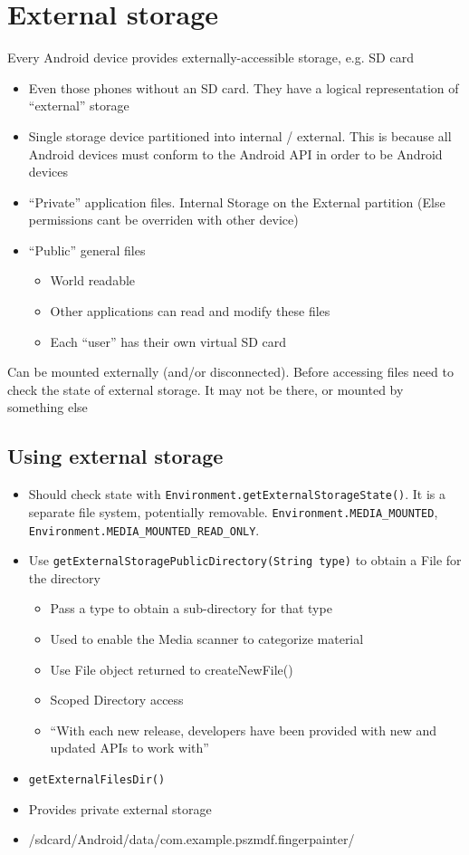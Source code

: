\documentclass{article}
\begin{document}
\section{External storage}
\begin{flushleft}
Every	Android	device	provides	externally-accessible	storage,	e.g.	SD	card
\begin{itemize}
  \item Even those phones without an SD card. They have a logical representation of “external” storage 
  \item Single storage device partitioned into internal / external. This is because all Android devices must conform to the Android API in order to be Android devices 
  \item “Private” application files. Internal Storage on the External partition (Else permissions cant be overriden with other device) 
  \item “Public” general files
  \begin{itemize}
    \item World readable 
    \item Other applications can read and modify these files 
    \item Each “user” has their own virtual SD card
  \end{itemize}
\end{itemize}
Can be mounted externally (and/or disconnected). Before accessing files need to check the state of external storage. It may not be there, or mounted by something else
\end{flushleft}

\subsection{Using external storage}

\begin{itemize}
  \item Should check state with \verb|Environment.getExternalStorageState()|. It is a separate file system, potentially removable. \verb|Environment.MEDIA_MOUNTED|, \verb|Environment.MEDIA_MOUNTED_READ_ONLY|.
  \item Use \texttt{getExternalStoragePublicDirectory(String type)} to obtain a File for the directory
  \begin{itemize}
    \item Pass a type to obtain a sub-directory for that type 
    \item Used to enable the Media scanner to categorize material 
    \item Use File object returned to createNewFile() 
    \item Scoped Directory access 
    \item “With each new release, developers have been provided with new and updated APIs to work with”
  \end{itemize}
  \item \verb|getExternalFilesDir()|
  \item Provides private external storage 
  \item /sdcard/Android/data/com.example.pszmdf.fingerpainter/
\end{itemize}
\end{document}
